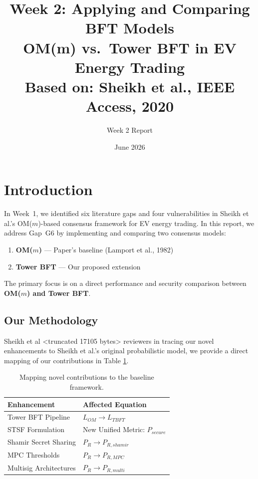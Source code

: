\documentclass[10pt,twocolumn,letterpaper]{article}
\title{\textbf{Week 2: Applying and Comparing BFT Models}\\[6pt]
\large OM(m) vs.\ Tower BFT in EV Energy Trading\\[4pt]
\normalsize Based on: Sheikh et al., IEEE Access, 2020}
\author{Week 2 Report}
\date{June 2026}
\begin{document}
\maketitle

\section{Introduction}

In Week~1, we identified six literature gaps and four vulnerabilities in
Sheikh et al.'s OM($m$)-based consensus framework for EV energy trading.
In this report, we address Gap~G6 by implementing and comparing two
consensus models:

\begin{enumerate}
\item \textbf{OM($m$)} --- Paper's baseline (Lamport et al., 1982)
\item \textbf{Tower BFT} --- Our proposed extension
\end{enumerate}

The primary focus is on a direct performance and security comparison between \textbf{OM($m$) and Tower BFT}.

\subsection{Our Methodology}

Sheikh et al
<truncated 17105 bytes>
reviewers in tracing our novel enhancements to Sheikh et al.'s original probabilistic model, we provide a direct mapping of our contributions in Table \ref{tab:mapping}.

\begin{table}[h]
\centering
\begin{tabular}{ll}
\toprule
\textbf{Enhancement} & \textbf{Affected Equation} \\
\midrule
Tower BFT Pipeline & $L_{OM} \rightarrow L_{TBFT}$ \\
STSF Formulation & New Unified Metric: $P_{secure}$ \\
Shamir Secret Sharing & $P_R \rightarrow P_{R,shamir}$ \\
MPC Thresholds & $P_R \rightarrow P_{R,MPC}$ \\
Multisig Architectures & $P_R \rightarrow P_{R,multi}$ \\
\bottomrule
\end{tabular}
\caption{Mapping novel contributions to the baseline framework.}
\label{tab:mapping}
\end{table}
\end{document}
